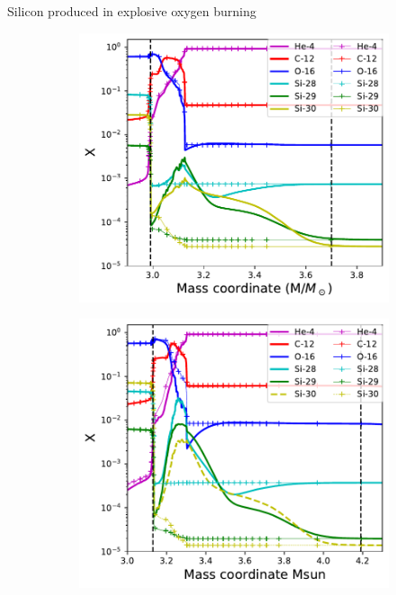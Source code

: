 \documentclass[10pt]{beamer}
\begin{document}
\begin{frame}{Silicon produced in explosive oxygen burning}
    \begin{figure}
        \begin{subfigure}[b]{0.38\textwidth}
            \includegraphics[width=\textwidth]{figs/150.02.pdf}
        \end{subfigure}
        \begin{subfigure}[b]{0.38\textwidth}
            \includegraphics[width=\textwidth]{figs/150.01.pdf}
        \end{subfigure}
        

\end{figure}
\end{frame}
\end{document}
